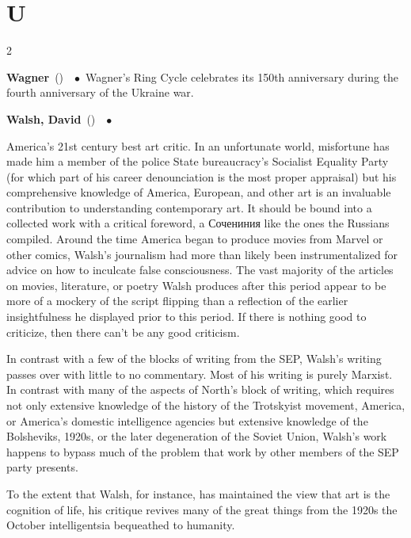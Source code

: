 \documentclass[10pt,a4paper,twoside]{article} %
\newcommand{\entry}[4]{\markboth{#1}{#1}\textbf{#1}\ {(#2)}\ \textit{#3}\ $\bullet$\ {#4}}  %
\begin{document}

\section*{U}

\begin{multicols}{2}

\entry{Wagner} {} {} {Wagner's Ring Cycle celebrates its 150th anniversary during the fourth anniversary of the Ukraine war.}


\entry{Walsh, David} {} {} {America's 21st century best art critic. In an unfortunate world, misfortune has made him a member of the police State bureaucracy's Socialist Equality Party (for which part of his career denounciation is the most proper appraisal) but his comprehensive knowledge of America, European, and other art is an invaluable contribution to understanding contemporary art. It should be bound into a collected work with a critical foreword, a \textrussian{Сочениния} like the ones the Russians compiled. Around the time America began to produce movies from Marvel or other comics, Walsh's journalism had more than likely been instrumentalized for advice on how to inculcate false consciousness. The vast majority of the articles on movies, literature, or poetry Walsh produces after this period appear to be more of a mockery of the script flipping than a reflection of the earlier insightfulness he displayed prior to this period. If there is nothing good to criticize, then there can't be any good criticism. 

\newline \indent In contrast with a few of the blocks of writing from the SEP, Walsh's writing passes over with little to no commentary. Most of his writing is purely Marxist. In contrast with many of the aspects of North's block of writing, which requires not only extensive knowledge of the history of the Trotskyist movement, America, or America's domestic intelligence agencies but extensive knowledge of the Bolsheviks, 1920s, or the later degeneration of the Soviet Union, Walsh's work happens to bypass much of the problem that work by other members of the SEP party presents. 

\newline \indent To the extent that Walsh, for instance, has maintained the view that art is the cognition of life, his critique revives many of the great things from the 1920s the October intelligentsia bequeathed to humanity.

}
\end{multicols}
\end{document}
